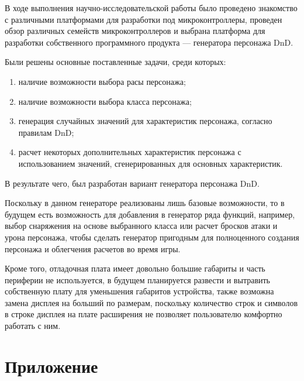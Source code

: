 \documentclass{altsu-report}
\begin{document}
В ходе выполнения научно-исследовательской работы было проведено знакомство с различными платформами для разработки под микроконтроллеры, проведен обзор различных семейств микроконтроллеров и выбрана платформа для разработки собственного программного продукта --- генератора персонажа DnD.

Были решены основные поставленные задачи, среди которых:

\begin{enumerate}
    \item наличие возможности выбора расы персонажа;
    
    \item наличие возможности выбора класса персонажа;
    
    \item генерация случайных значений для характеристик персонажа, согласно правилам DnD;
    
    \item расчет некоторых дополнительных характеристик персонажа с использованием значений, сгенерированных для основных характеристик.
\end{enumerate}

В результате чего, был разработан вариант генератора персонажа DnD.

Поскольку в данном генераторе реализованы лишь базовые возможности, то в будущем есть возможность для добавления в генератор ряда функций, например, выбор снаряжения на основе выбранного класса или расчет бросков атаки и урона персонажа, чтобы сделать генератор пригодным для полноценного создания персонажа и облегчения расчетов во время игры.

Кроме того, отладочная плата имеет довольно большие габариты и часть периферии не используется, в будущем планируется развести и вытравить собственную плату для уменьшения габаритов устройства, также возможна замена дисплея на больший по размерам, поскольку количество строк и символов в строке дисплея на плате расширения не позволяет пользователю комфортно работать с ним.

\newpage
{}
\printbibliography[title={Список использованной литературы}]

\chapter*{Приложение}
\end{document}

